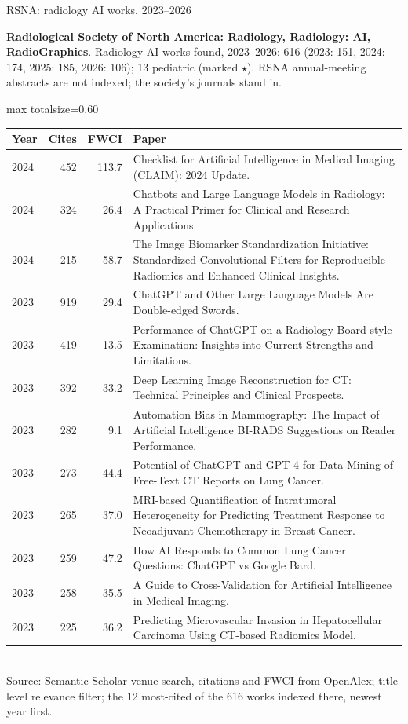 \documentclass[aspectratio=169]{beamer}
\renewcommand{\arraystretch}{1.08}
\begin{document}
\begin{frame}[category=Conferences]{RSNA: radiology AI works, 2023--2026}
{\scriptsize \textbf{Radiological Society of North America: Radiology, Radiology: AI, RadioGraphics}. Radiology-AI works found, 2023--2026: 616 (2023: 151, 2024: 174, 2025: 185, 2026: 106); 13 pediatric (marked $\star$). RSNA annual-meeting abstracts are not indexed; the society's journals stand in.\par}\vspace{2pt}
\tiny
\begin{adjustbox}{max totalsize={\textwidth}{0.60\textheight}}
\renewcommand{\arraystretch}{1.2}
\begin{tabular}{|l|r|r|>{\raggedright\arraybackslash}p{}|}
\hline \textbf{Year} & \textbf{Cites} & \textbf{FWCI} & \textbf{Paper} \\ \hline
2024 & 452 & 113.7 & Checklist for Artificial Intelligence in Medical Imaging (CLAIM): 2024 Update. \\ \hline
2024 & 324 & 26.4 & Chatbots and Large Language Models in Radiology: A Practical Primer for Clinical and Research Applications. \\ \hline
2024 & 215 & 58.7 & The Image Biomarker Standardization Initiative: Standardized Convolutional Filters for Reproducible Radiomics and Enhanced Clinical Insights. \\ \hline
2023 & 919 & 29.4 & ChatGPT and Other Large Language Models Are Double-edged Swords. \\ \hline
2023 & 419 & 13.5 & Performance of ChatGPT on a Radiology Board-style Examination: Insights into Current Strengths and Limitations. \\ \hline
2023 & 392 & 33.2 & Deep Learning Image Reconstruction for CT: Technical Principles and Clinical Prospects. \\ \hline
2023 & 282 & 9.1 & Automation Bias in Mammography: The Impact of Artificial Intelligence BI-RADS Suggestions on Reader Performance. \\ \hline
2023 & 273 & 44.4 & Potential of ChatGPT and GPT-4 for Data Mining of Free-Text CT Reports on Lung Cancer. \\ \hline
2023 & 265 & 37.0 & MRI-based Quantification of Intratumoral Heterogeneity for Predicting Treatment Response to Neoadjuvant Chemotherapy in Breast Cancer. \\ \hline
2023 & 259 & 47.2 & How AI Responds to Common Lung Cancer Questions: ChatGPT vs Google Bard. \\ \hline
2023 & 258 & 35.5 & A Guide to Cross-Validation for Artificial Intelligence in Medical Imaging. \\ \hline
2023 & 225 & 36.2 & Predicting Microvascular Invasion in Hepatocellular Carcinoma Using CT-based Radiomics Model. \\ \hline
\end{tabular}
\end{adjustbox}
\\[2pt]
{\tiny Source: Semantic Scholar venue search, citations and FWCI from OpenAlex; title-level relevance filter; the 12 most-cited of the 616 works indexed there, newest year first.}
\end{frame}
\end{document}
